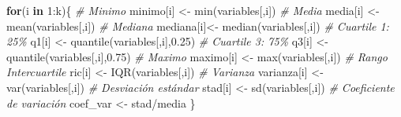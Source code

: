 \documentclass{staprojteamusb}
\newenvironment{Shaded}{\begin{snugshade}}{\end{snugshade}}
\newcommand{\CommentTok}[1]{\textcolor[rgb]{0.56,0.35,0.01}{\textit{#1}}}
\newcommand{\ControlFlowTok}[1]{\textcolor[rgb]{0.13,0.29,0.53}{\textbf{#1}}}
\newcommand{\DecValTok}[1]{\textcolor[rgb]{0.00,0.00,0.81}{#1}}
\newcommand{\FloatTok}[1]{\textcolor[rgb]{0.00,0.00,0.81}{#1}}
\newcommand{\FunctionTok}[1]{\textcolor[rgb]{0.00,0.00,0.00}{#1}}
\newcommand{\NormalTok}[1]{#1}
\newcommand{\OtherTok}[1]{\textcolor[rgb]{0.56,0.35,0.01}{#1}}
\newcommand{\SpecialCharTok}[1]{\textcolor[rgb]{0.00,0.00,0.00}{#1}}
\begin{document}
\begin{Shaded}
\begin{Highlighting}[]
  \ControlFlowTok{for}\NormalTok{(i }\ControlFlowTok{in} \DecValTok{1}\SpecialCharTok{:}\NormalTok{k)\{}
    \CommentTok{\# Minimo }
\NormalTok{    minimo[i] }\OtherTok{\textless{}{-}} \FunctionTok{min}\NormalTok{(variables[,i])}
    \CommentTok{\# Media}
\NormalTok{    media[i] }\OtherTok{\textless{}{-}} \FunctionTok{mean}\NormalTok{(variables[,i])}
    \CommentTok{\# Mediana}
\NormalTok{    mediana[i]}\OtherTok{\textless{}{-}} \FunctionTok{median}\NormalTok{(variables[,i])}
    \CommentTok{\# Cuartile 1: 25\%}
\NormalTok{    q1[i] }\OtherTok{\textless{}{-}} \FunctionTok{quantile}\NormalTok{(variables[,i],}\FloatTok{0.25}\NormalTok{)}
    \CommentTok{\# Cuartile 3: 75\%}
\NormalTok{    q3[i] }\OtherTok{\textless{}{-}} \FunctionTok{quantile}\NormalTok{(variables[,i],}\FloatTok{0.75}\NormalTok{)}
    \CommentTok{\# Maximo }
\NormalTok{    maximo[i] }\OtherTok{\textless{}{-}} \FunctionTok{max}\NormalTok{(variables[,i])}
    \CommentTok{\# Rango Intercuartile }
\NormalTok{    ric[i] }\OtherTok{\textless{}{-}} \FunctionTok{IQR}\NormalTok{(variables[,i])}
    \CommentTok{\# Varianza }
\NormalTok{    varianza[i] }\OtherTok{\textless{}{-}} \FunctionTok{var}\NormalTok{(variables[,i])}
    \CommentTok{\# Desviación estándar}
\NormalTok{    stad[i] }\OtherTok{\textless{}{-}} \FunctionTok{sd}\NormalTok{(variables[,i])}
    \CommentTok{\# Coeficiente de variación}
\NormalTok{    coef\_var }\OtherTok{\textless{}{-}}\NormalTok{  stad}\SpecialCharTok{/}\NormalTok{media }
\NormalTok{  \}}
  

\end{Highlighting}
\end{Shaded}
\end{document}

